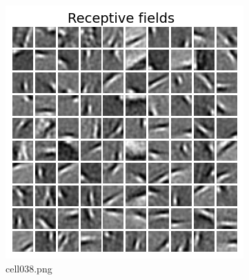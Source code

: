 \begin{figure}[ht]
	\centering
	\includegraphics[scale=0.8, max width=\linewidth]{./fig/energy-based-model/sparse-coding/cell038.png}
	\caption{cell038.png}
	\label{cell038.png}
\end{figure}